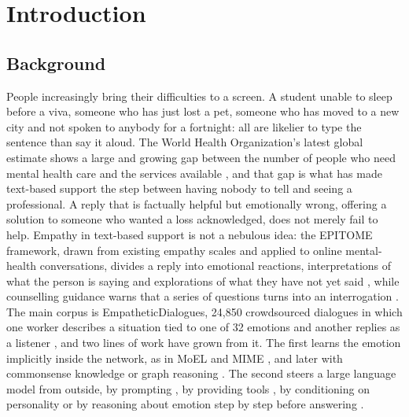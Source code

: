 \chapter{Introduction}
\label{ch:1}

\section{Background}
\label{sec:1.1}

People increasingly bring their difficulties to a screen. A student unable to sleep before a viva, someone who has just lost a pet, someone who has moved to a new city and not spoken to anybody for a fortnight: all are likelier to type the sentence than say it aloud. The World Health Organization's latest global estimate shows a large and growing gap between the number of people who need mental health care and the services available \cite{who2022report}, and that gap is what has made text-based support the step between having nobody to tell and seeing a professional. A reply that is factually helpful but emotionally wrong, offering a solution to someone who wanted a loss acknowledged, does not merely fail to help. Empathy in text-based support is not a nebulous idea: the EPITOME framework, drawn from existing empathy scales and applied to online mental-health conversations, divides a reply into emotional reactions, interpretations of what the person is saying and explorations of what they have not yet said \cite{sharma2020epitome}, while counselling guidance warns that a series of questions turns into an interrogation \cite{samhsa2019tip35}. The main corpus is EmpatheticDialogues, 24,850 crowdsourced dialogues in which one worker describes a situation tied to one of 32 emotions and another replies as a listener \cite{rashkin2019,ed_github}, and two lines of work have grown from it. The first learns the emotion implicitly inside the network, as in MoEL \cite{lin2019moel} and MIME \cite{majumder2020mime}, and later with commonsense knowledge or graph reasoning \cite{li2020empdg,li2022kemp,sabour2022cem,zhou2023case,yang2023escm}. The second steers a large language model from outside, by prompting \cite{qian2023llm,loh2023harnessing}, by providing tools \cite{cao2025tooled}, by conditioning on personality \cite{wu2025traits} or by reasoning about emotion step by step before answering \cite{li2024emotioncot}.


